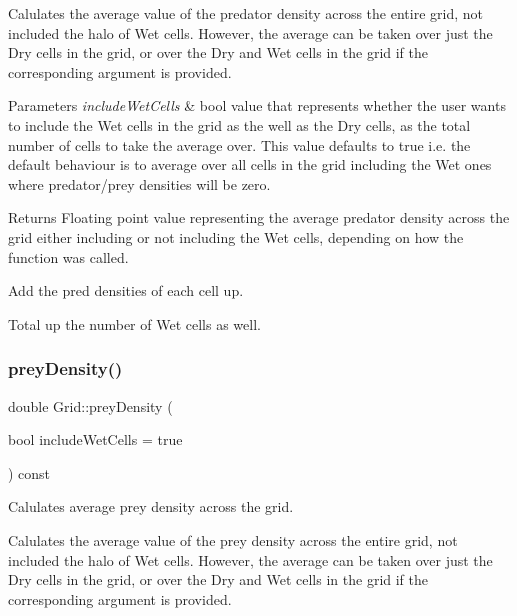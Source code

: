 Calulates the average value of the predator density across the entire grid, not included the halo of Wet cells. However, the average can be taken over just the Dry cells in the grid, or over the Dry and Wet cells in the grid if the corresponding argument is provided.


\begin{DoxyParams}{Parameters}
{\em include\+Wet\+Cells} & bool value that represents whether the user wants to include the Wet cells in the grid as the well as the Dry cells, as the total number of cells to take the average over. This value defaults to true i.\+e. the default behaviour is to average over all cells in the grid including the Wet ones where predator/prey densities will be zero.\\
\hline
\end{DoxyParams}
\begin{DoxyReturn}{Returns}
Floating point value representing the average predator density across the grid either including or not including the Wet cells, depending on how the function was called. 
\end{DoxyReturn}
Add the pred densities of each cell up.

Total up the number of Wet cells as well. \mbox{\label{class_grid_a7dc8ae18c31e8e680f6369d7c07ea881}} 
\subsubsection{\texorpdfstring{prey\+Density()}{preyDensity()}}
{\footnotesize\ttfamily double Grid\+::prey\+Density (\begin{DoxyParamCaption}\item[{bool}]{include\+Wet\+Cells = {\ttfamily true} }\end{DoxyParamCaption}) const}



Calulates average prey density across the grid. 

Calulates the average value of the prey density across the entire grid, not included the halo of Wet cells. However, the average can be taken over just the Dry cells in the grid, or over the Dry and Wet cells in the grid if the corresponding argument is provided.


